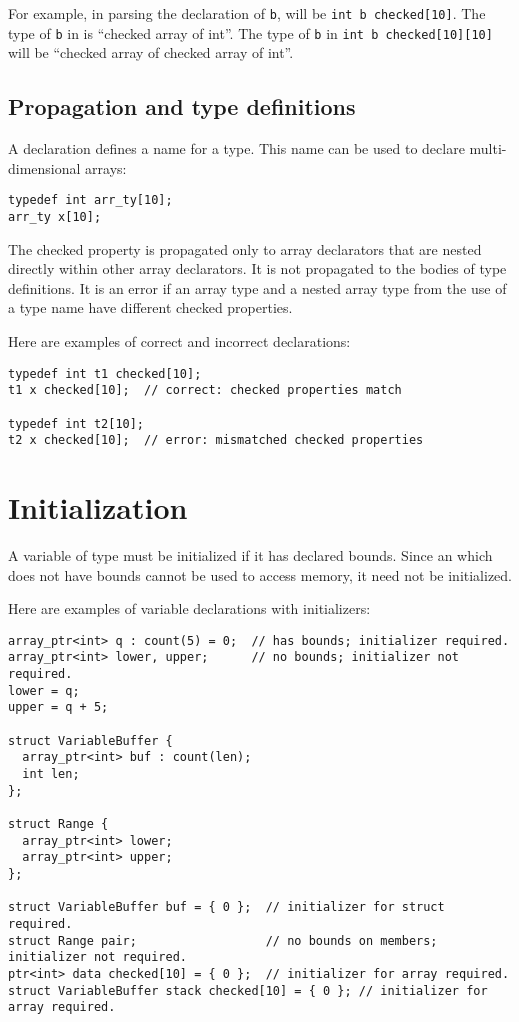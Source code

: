 For example, in parsing the declaration of \lstinline+b+, 
will be \lstinline+int b checked[10]+. The type of \lstinline+b+ in
 is ``checked array of int''. The type of \lstinline+b+ in
\lstinline+int b checked[10][10]+ will be ``checked array of
checked array of int''.

\subsection{Propagation and type definitions}

A  declaration defines a name for a type. This name
can be used to declare multi-dimensional arrays:
\begin{lstlisting}
typedef int arr_ty[10];
arr_ty x[10];
\end{lstlisting}
The checked property is propagated only to array declarators that are
nested directly within other array declarators.   It is not propagated to
the bodies of type definitions.  It is an error if an array type and a nested
array type from the use of a type name have different checked properties.

Here are examples of correct and incorrect declarations:
\begin{lstlisting}
typedef int t1 checked[10];
t1 x checked[10];  // correct: checked properties match

typedef int t2[10];
t2 x checked[10];  // error: mismatched checked properties
\end{lstlisting}

\section{Initialization}


A variable of type \arrayptrT must be initialized if it has declared bounds. Since an
\arrayptrT which does not have bounds cannot be used to access memory, it need not be
initialized.

Here are examples of variable declarations with initializers:
\begin{lstlisting}
array_ptr<int> q : count(5) = 0;  // has bounds; initializer required.
array_ptr<int> lower, upper;      // no bounds; initializer not required.
lower = q;
upper = q + 5;

struct VariableBuffer {
  array_ptr<int> buf : count(len);
  int len;
};

struct Range {
  array_ptr<int> lower;
  array_ptr<int> upper;
};

struct VariableBuffer buf = { 0 };  // initializer for struct required.
struct Range pair;                  // no bounds on members; initializer not required.
ptr<int> data checked[10] = { 0 };  // initializer for array required.
struct VariableBuffer stack checked[10] = { 0 }; // initializer for array required.
\end{lstlisting}

